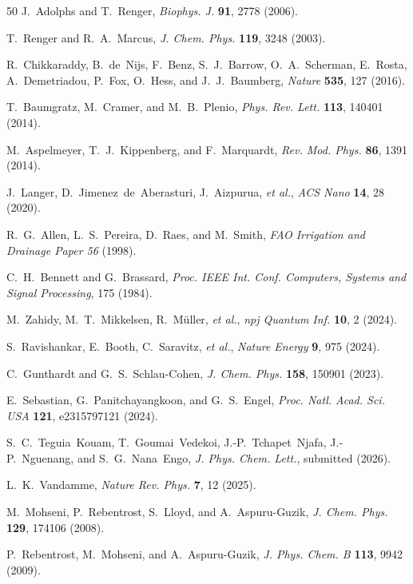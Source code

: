 \documentclass[twocolumn]{article}
\begin{document}
\begin{thebibliography}{50}
J.~Adolphs and T.~Renger, \textit{Biophys. J.} \textbf{91}, 2778 (2006).

T.~Renger and R.~A.~Marcus, \textit{J. Chem. Phys.} \textbf{119}, 3248 (2003).

R.~Chikkaraddy, B.~de~Nijs, F.~Benz, S.~J.~Barrow, O.~A.~Scherman, E.~Rosta, A.~Demetriadou, P.~Fox, O.~Hess, and J.~J.~Baumberg, \textit{Nature} \textbf{535}, 127 (2016).

T.~Baumgratz, M.~Cramer, and M.~B.~Plenio, \textit{Phys. Rev. Lett.} \textbf{113}, 140401 (2014).

M.~Aspelmeyer, T.~J.~Kippenberg, and F.~Marquardt, \textit{Rev. Mod. Phys.} \textbf{86}, 1391 (2014).

J.~Langer, D.~Jimenez~de~Aberasturi, J.~Aizpurua, \textit{et al.}, \textit{ACS Nano} \textbf{14}, 28 (2020).

R.~G.~Allen, L.~S.~Pereira, D.~Raes, and M.~Smith, \textit{FAO Irrigation and Drainage Paper 56} (1998).

C.~H.~Bennett and G.~Brassard, \textit{Proc. IEEE Int. Conf. Computers, Systems and Signal Processing}, 175 (1984).

M.~Zahidy, M.~T.~Mikkelsen, R.~M\"{u}ller, \textit{et al.}, \textit{npj Quantum Inf.} \textbf{10}, 2 (2024).

S.~Ravishankar, E.~Booth, C.~Saravitz, \textit{et al.}, \textit{Nature Energy} \textbf{9}, 975 (2024).

C.~Gunthardt and G.~S.~Schlau-Cohen, \textit{J. Chem. Phys.} \textbf{158}, 150901 (2023).

E.~Sebastian, G.~Panitchayangkoon, and G.~S.~Engel, \textit{Proc. Natl. Acad. Sci. USA} \textbf{121}, e2315797121 (2024).

S.~C.~Teguia~Kouam, T.~Goumai~Vedekoi, J.-P.~Tchapet~Njafa, J.-P.~Nguenang, and S.~G.~Nana~Engo, \textit{J. Phys. Chem. Lett.}, submitted (2026).

L.~K.~Vandamme, \textit{Nature Rev. Phys.} \textbf{7}, 12 (2025).

M.~Mohseni, P.~Rebentrost, S.~Lloyd, and A.~Aspuru-Guzik, \textit{J. Chem. Phys.} \textbf{129}, 174106 (2008).

P.~Rebentrost, M.~Mohseni, and A.~Aspuru-Guzik, \textit{J. Phys. Chem. B} \textbf{113}, 9942 (2009).


\end{thebibliography}
\end{document}
